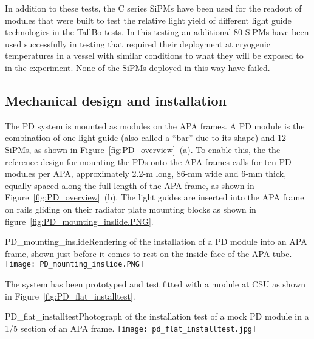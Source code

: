 In addition to these tests, the C series SiPMs have been used for the
readout of modules that were built to test the relative light yield of
different light guide technologies in the TallBo tests.  In this testing 
an additional 80 SiPMs have been used successfully in testing that 
required their deployment at cryogenic temperatures in a vessel with 
similar conditions to what they will be exposed to in the experiment.
None of the SiPMs deployed in this way have failed.

\subsection{Mechanical design and installation}


The PD system is mounted as modules on the APA frames.  A PD module is
the combination of one light-guide (also called a ``bar'' due to its
shape) and 12 SiPMs, as shown in Figure~\ref{fig:PD_overview}~(a).  To
enable this, the the reference design for mounting the PDs onto the
APA frames calls for ten PD modules per APA, approximately 2.2-m long,
86-mm wide and 6-mm thick, equally spaced along the full length of the
APA frame, as shown in Figure~\ref{fig:PD_overview}~(b). 
The light guides are inserted into the APA frame on rails gliding on their radiator
plate mounting blocks as shown in figure~\ref{fig:PD_mounting_inslide.PNG}.
\begin{cdrfigure}
  {PD_mounting_inslide}{Rendering of the installation of a PD module
    into an APA frame, shown just before it comes to rest on the inside face
    of the APA tube.}
\texttt{[image: PD\_mounting\_inslide.PNG]}
\end{cdrfigure}

The system has been prototyped and test fitted with a module at CSU 
as shown in Figure~\ref{fig:PD_flat_installtest}.
\begin{cdrfigure}
  {PD_flat_installtest}{Photograph of the installation
    test of a mock PD module in a 1/5 section of an APA frame.}
\texttt{[image: pd\_flat\_installtest.jpg]}
\end{cdrfigure}


